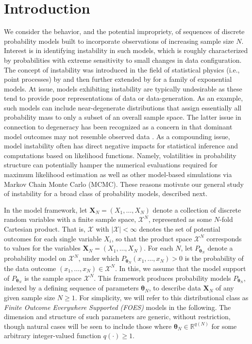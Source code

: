 \documentclass[numbib]{imamat}
\theoremstyle{theorem}
\theoremstyle{lemma}
\theoremstyle{example}
\theoremstyle{corollary}
\theoremstyle{definition}
\theoremstyle{remark}
\theoremstyle{approximation}
\theoremstyle{scheme}
\newcommand{\ak}[1]{{\color{blue} #1}}
\begin{document}
\hypertarget{introduction}{%
\section{Introduction}\label{introduction}}

We consider the behavior, and the potential impropriety, of sequences of discrete probability models built to incorporate observations of increasing sample size \(N\). Interest is in identifying instability in such models, which is roughly characterized by probabilities with extreme sensitivity to small changes in data configuration. The concept of instability was introduced in the field of statistical physics (i.e., point processes) by \citet{ruelle1999statistical} and then further extended by \citet{schweinberger2011instability} for a family of exponential models. At issue, models exhibiting instability are typically undesirable as these tend to provide poor representations of data or data-generation. As an example, such models can include near-degenerate distributions that assign essentially all probability mass to only a subset of an overall sample space. The latter issue in connection to degeneracy has been recognized as a concern in that dominant model outcomes may not resemble observed data \citep[cf.~][]{handcock2003assessing}. As a compounding issue, model instability often has direct negative impacts for statistical inference and computations based on likelihood functions. Namely, volatilities in probability structure can potentially hamper the numerical evaluations required for maximum likelihood estimation as well as other model-based simulations via Markov Chain Monte Carlo (MCMC). These reasons motivate our general study of instability for a broad class of probability models, described next.

In the model framework, let \(\boldsymbol X_N = (X_1, \dots, X_N)\) denote a collection of discrete random variables with a finite sample space, \(\mathcal{X}^N\), represented as some \(N\)-fold Cartesian product. That is, \(\mathcal{X}\) with \(|\mathcal{X}| < \infty\) denotes the set of potential outcomes for each single variable \(X_i\), so that the product space \(\mathcal{X}^N\) corresponds to values for the variables \(\boldsymbol X_N=(X_1,\ldots,X_N)\). For each \(N\), let \(P_{\boldsymbol \theta_N}\) denote a probability model on \(\mathcal{X}^N\), under which \(P_{\boldsymbol \theta_N}(x_1, \dots, x_N) > 0\) is the probability of the data outcome \((x_1, \dots, x_N) \in \mathcal{X}^N\). In this, we assume that the model support of \(P_{\boldsymbol \theta_N}\) is the sample space \(\mathcal{X}^N\). This framework produces probability models \(P_{\boldsymbol \theta_N}\), indexed by a \ak{defining} sequence of parameters \(\boldsymbol \theta_N\), to describe data \(\boldsymbol X_N\) of any given sample size \(N \geq 1\). For simplicity, we will refer to this distributional class as \emph{Finite Outcome Everywhere Supported (FOES)} models in the following. The dimension and structure of such parameters are generic, without restriction, though natural cases will be seen to include those where \(\boldsymbol \theta_N \in \mathbb{R}^{q(N)}\) for some arbitrary integer-valued function \(q(\cdot) \geq 1\).
\end{document}
